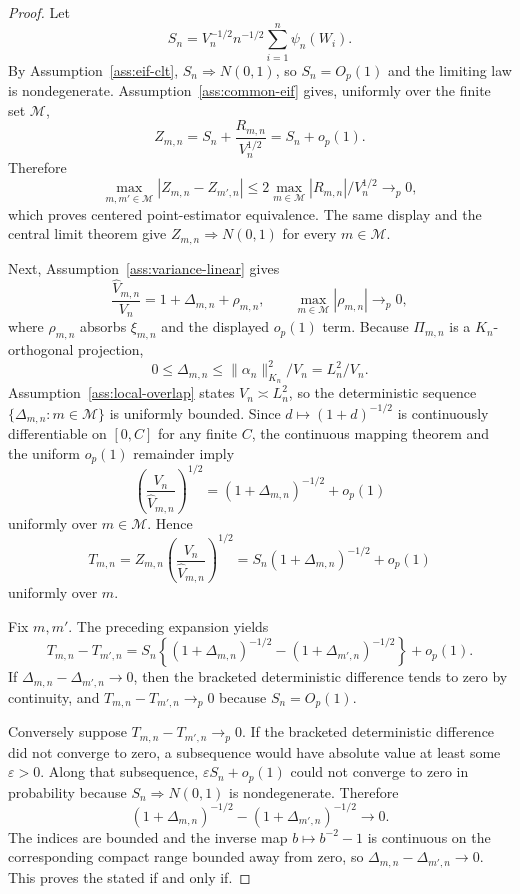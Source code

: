 \begin{proof}
Let
\[
  S_n=V_n^{-1/2}n^{-1/2}\sum_{i=1}^n\psi_n(W_i).
\]
By Assumption~\ref{ass:eif-clt}, \(S_n\Rightarrow N(0,1)\), so \(S_n=O_p(1)\)
and the limiting law is nondegenerate.  Assumption~\ref{ass:common-eif} gives,
uniformly over the finite set \(\mathcal M\),
\[
  Z_{m,n}=S_n+\frac{R_{m,n}}{V_n^{1/2}}
  =S_n+o_p(1).
\]
Therefore
\[
  \max_{m,m'\in\mathcal M}|Z_{m,n}-Z_{m',n}|
  \le
  2\max_{m\in\mathcal M}|R_{m,n}|/V_n^{1/2}
  \to_p0,
\]
which proves centered point-estimator equivalence.  The same display and the
central limit theorem give \(Z_{m,n}\Rightarrow N(0,1)\) for every
\(m\in\mathcal M\).

Next, Assumption~\ref{ass:variance-linear} gives
\[
  \frac{\hat V_{m,n}}{V_n}=1+\Delta_{m,n}+\rho_{m,n},
  \qquad
  \max_{m\in\mathcal M}|\rho_{m,n}|\to_p0,
\]
where \(\rho_{m,n}\) absorbs \(\xi_{m,n}\) and the displayed \(o_p(1)\) term.
Because \(\Pi_{m,n}\) is a \(K_n\)-orthogonal projection,
\[
  0\le\Delta_{m,n}
  \le \|\alpha_n\|_{K_n}^2/V_n
  =L_n^2/V_n.
\]
Assumption~\ref{ass:local-overlap} states \(V_n\asymp L_n^2\), so the
deterministic sequence \(\{\Delta_{m,n}:m\in\mathcal M\}\) is uniformly
bounded.  Since \(d\mapsto(1+d)^{-1/2}\) is continuously differentiable on
\([0,C]\) for any finite \(C\), the continuous mapping theorem and the
uniform \(o_p(1)\) remainder imply
\[
  \left(\frac{V_n}{\hat V_{m,n}}\right)^{1/2}
  =
  (1+\Delta_{m,n})^{-1/2}+o_p(1)
\]
uniformly over \(m\in\mathcal M\).  Hence
\[
  T_{m,n}
  =
  Z_{m,n}\left(\frac{V_n}{\hat V_{m,n}}\right)^{1/2}
  =
  S_n(1+\Delta_{m,n})^{-1/2}+o_p(1)
\]
uniformly over \(m\).

Fix \(m,m'\).  The preceding expansion yields
\[
  T_{m,n}-T_{m',n}
  =
  S_n\left\{(1+\Delta_{m,n})^{-1/2}
      -(1+\Delta_{m',n})^{-1/2}\right\}
  +o_p(1).
\]
If \(\Delta_{m,n}-\Delta_{m',n}\to0\), then the bracketed deterministic
difference tends to zero by continuity, and \(T_{m,n}-T_{m',n}\to_p0\)
because \(S_n=O_p(1)\).

Conversely suppose \(T_{m,n}-T_{m',n}\to_p0\).  If the bracketed deterministic
difference did not converge to zero, a subsequence would have absolute value
at least some \(\varepsilon>0\).  Along that subsequence,
\(\varepsilon S_n+o_p(1)\) could not converge to zero in probability because
\(S_n\Rightarrow N(0,1)\) is nondegenerate.  Therefore
\[
  (1+\Delta_{m,n})^{-1/2}
      -(1+\Delta_{m',n})^{-1/2}\to0.
\]
The indices are bounded and the inverse map \(b\mapsto b^{-2}-1\) is
continuous on the corresponding compact range bounded away from zero, so
\(\Delta_{m,n}-\Delta_{m',n}\to0\).  This proves the stated if and only if.


\end{proof}
